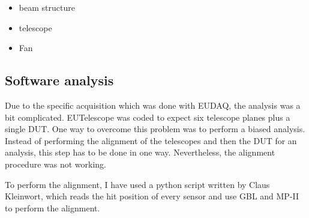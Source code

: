     \begin{itemize}
      \item beam structure
      \item telescope
      \item Fan
    \end{itemize}
    \begin{figure}
    \end{figure}

    \subsection{Software analysis}

    Due to the specific acquisition which was done with EUDAQ, the analysis was a bit complicated.
    EUTelescope was coded to expect six telescope planes plus a single DUT.
    One way to overcome this problem was to perform a biased analysis.
    Instead of performing the alignment of the telescopes and then the DUT for an analysis, this step has to be done in one way.
    Nevertheless, the alignment procedure was not working.

    To perform the alignment, I have used a python script written by Claus Kleinwort, which reads the hit position of every sensor and use GBL and MP-II to perform the alignment.

